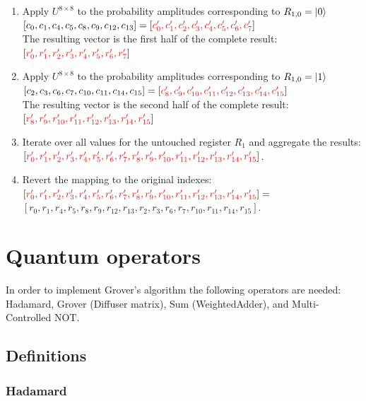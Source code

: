 \begin{enumerate}
    \item Apply $U^{8\times{}8}$ to the probability amplitudes corresponding to $R_{1,0} = \ket{0}$\\
    $[c_0,c_1,c_4,c_5,c_8,c_9,c_{12},c_{13}] = [\color{red}c'_0,c'_1,c'_2,c'_3,c'_4,c'_5,c'_6,c'_7\color{black}]$\\
    The resulting vector is the first half of the complete result:\\
    $[\color{red}r'_0,r'_1,r'_2,r'_3,r'_4,r'_5,r'_6,r'_7\color{black}]$
    \item Apply $U^{8\times{}8}$ to the probability amplitudes corresponding to $R_{1,0} = \ket{1}$\\
    $[c_2,c_3,c_6,c_7,c_{10},c_{11},c_{14},c_{15}] = [\color{red}c'_8,c'_9,c'_{10},c'_{11},c'_{12},c'_{13},c'_{14},c'_{15}\color{black}]$\\
    The resulting vector is the second half of the complete result:\\
    $[\color{red}r'_8,r'_9,r'_{10},r'_{11},r'_{12},r'_{13},r'_{14},r'_{15}\color{black}]$
    \item Iterate over all values for the untouched register $R_1$ and aggregate the results:\\
     $[\color{red}r'_0,r'_1,r'_2,r'_3,r'_4,r'_5,r'_6,r'_7,r'_8,r'_9,r'_{10},r'_{11},r'_{12},r'_{13},r'_{14},r'_{15}\color{black}]$.
    \item Revert the mapping to the original indexes:\\ $[\color{red}r'_0,r'_1,r'_2,r'_3,r'_4,r'_5,r'_6,r'_7,r'_8,r'_9,r'_{10},r'_{11},r'_{12},r'_{13},r'_{14},r'_{15}\color{black}] =$\\
    $[r_0,r_1,r_4,r_5,r_8,r_9,r_{12},r_{13},r_2,r_3,r_6,r_7,r_{10},r_{11},r_{14},r_{15}]$.
\end{enumerate}

\section{Quantum operators}

In order to implement Grover's algorithm the following operators are needed: Hadamard, Grover (Diffuser matrix), Sum (WeightedAdder), and Multi-Controlled NOT.

\subsection{Definitions}

\subsubsection{Hadamard}

